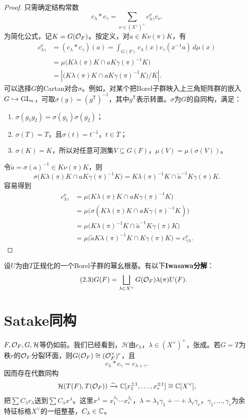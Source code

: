 \begin{proof}
只需确定结构常数
\[c_\lambda*c_\gamma=\sum_{\nu\in(X^\vee)^+}c^\nu_{\lambda\gamma}c_\nu.\]
为简化公式，记$K=G(\mathcal O_F)$。按定义，对$a\in K\nu(\pi)K$，有
\begin{align*}
c^\nu_{\lambda\gamma}&=(c_\lambda*c_\gamma)(a)=\int_{G(F)}c_\lambda(x)c_\gamma(x^{-1}a)\,d\mu(x)\\
&=\mu\bigl(K\lambda(\pi)K\cap aK\gamma(\pi)^{-1}K\bigr)\\
&=\left|\bigl(K\lambda(\pi)K\cap aK\gamma(\pi)^{-1}K\bigr)/K\right|.
\end{align*}
可以选择$G$的Cartan对合$\sigma$。例如，对某个把Borel子群映入上三角矩阵群的嵌入$G\hookrightarrow\operatorname{GL}_n$，可取$\sigma(g)=(g^{\mathsf T})^{-1}$，其中$g^{\mathsf T}$表示转置。$\sigma$为$G$的自同构，满足：
\begin{enumerate}[label=\arabic*.]
\item $\sigma(g_1g_2)=\sigma(g_1)\sigma(g_2)$；
\item $\sigma(T)=T$，且$\sigma(t)=t^{-1}$，$t\in T$；
\item $\sigma(K)=K$，所以对任意可测集$V\subseteq G(F)$，$\mu(V)=\mu(\sigma(V))$。
\end{enumerate}
令$\widetilde a=\sigma(a)^{-1}\in K\nu(\pi)K$，则
\[\sigma\bigl(K\lambda(\pi)K\cap aK\gamma(\pi)^{-1}K\bigr)=K\lambda(\pi)^{-1}K\cap\widetilde a^{-1}K\gamma(\pi)K.\]
容易得到
\begin{align*}
c^\nu_{\lambda\gamma}&=\mu\bigl(K\lambda(\pi)K\cap aK\gamma(\pi)^{-1}K\bigr)\\
&=\mu\bigl(\sigma(K\lambda(\pi)K\cap aK\gamma(\pi)^{-1}K)\bigr)\\
&=\mu\bigl(K\lambda(\pi)^{-1}K\cap\widetilde a^{-1}K\gamma(\pi)K\bigr)\\
&=\mu\bigl(\widetilde aK\lambda(\pi)^{-1}K\cap K\gamma(\pi)K\bigr)=c^\nu_{\gamma\lambda}.
\end{align*}
\end{proof}
设$U$为由$T$正规化的一个Borel子群的幂幺根基。有以下\textbf{Iwasawa分解}：
\begin{equation}\tag{2.3}\label{L19eq23}G(F)=\bigsqcup_{\lambda\in X^\vee}G(\mathcal O_F)\lambda(\pi)U(F).\end{equation}
\section{Satake同构}\label{L19S3}
$F,\mathcal O_F,G,\mathcal H$等仍如前。我们已经看到，$\mathcal H$由$c_\lambda$，$\lambda\in(X^\vee)^+$，张成。若$G=T$为秩$r$的$\mathcal O_F$分裂环面，则$G(\mathcal O_F)\cong(\mathcal O_F^\times)^r$，且
\[c_\lambda*c_\gamma=c_{\lambda+\gamma}.\]
因而存在代数同构
\[\mathcal H(T(F),T(\mathcal O_F))\xrightarrow{\sim}\mathbb{C}[x_1^{\pm1},\ldots,x_r^{\pm1}]\cong\mathbb{C}[X^\vee],\]
把$\sum C_\lambda c_\lambda$送到$\sum C_\lambda x^\lambda$。这里$x^\lambda=x_1^{\lambda_1}\cdots x_r^{\lambda_r}$，$\lambda=\lambda_1\gamma_1+\cdots+\lambda_r\gamma_r$，$\gamma_1,\ldots,\gamma_r$为余特征标格$X^\vee$的一组整基，$C_\lambda\in\mathbb{C}$。

